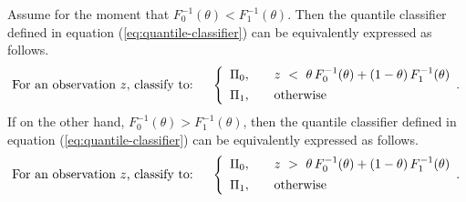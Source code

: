 \begin{lemma}
  \label{lem:decision-boundary}
  Assume for the moment that $F_{0}^{-1}(\theta) < F_{1}^{-1}(\theta)$.  Then
  the quantile classifier defined in equation (\ref{eq:quantile-classifier}) can
  be equivalently expressed as follows.
  \begin{equation}
    \label{eq:alt-quantile-classifier-less}
    \text{For an observation $z$, classify to:} \hspace{5mm} \left\{ 
      \begin{array}{lcl}
        \Pi_{0}, & & z ~<~ \theta\, F_{0}^{-1}(\theta) +
                       (1 - \theta)\, F_{1}^{-1}(\theta) \\[1ex]
        \Pi_{1}, & & \textup{otherwise}
      \end{array} .
    \right.
  \end{equation}
  If on the other hand, $F_{0}^{-1}(\theta) > F_{1}^{-1}(\theta)$, then the
  quantile classifier defined in equation (\ref{eq:quantile-classifier}) can be
  equivalently expressed as follows.
  \begin{equation}
    \label{eq:alt-quantile-classifier-greater}
    \text{For an observation $z$, classify to:} \hspace{5mm} \left\{ 
      \begin{array}{lcl}
        \Pi_{0}, & & z ~>~ \theta\, F_{0}^{-1}(\theta) +
                     (1 - \theta)\, F_{1}^{-1}(\theta) \\[1ex]
        \Pi_{1}, & & \textup{otherwise}
      \end{array} .
    \right.
  \end{equation}
\end{lemma}

